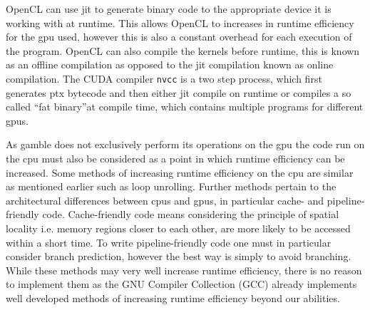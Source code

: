 OpenCL can use \acrshort{jit} to generate binary code to the appropriate device it is working with at runtime.
This allows OpenCL to increases in runtime efficiency for the \acrshort{gpu} used, however this is also a constant overhead for each execution of the program. 
OpenCL can also compile the kernels before runtime, this is known as an offline compilation as opposed to the \acrshort{jit} compilation known as online compilation. 
The CUDA compiler \texttt{nvcc} is a two step process, which first generates \acrshort{ptx} bytecode and then either \acrshort{jit} compile on runtime or compiles a so called ``fat binary''at compile time, which contains multiple programs for different \acrshort{gpu}s. \citep{nvidia_cude_fat_bin}

As \gls{gamble} does not exclusively perform its operations on the \acrshort{gpu} the code run on the \acrshort{cpu} must also be considered as a point in which runtime efficiency can be increased.
Some methods of increasing runtime efficiency on the \acrshort{cpu} are similar as mentioned earlier such as loop unrolling.
Further methods pertain to the architectural differences between \acrshort{cpu}s and \acrshort{gpu}s, in particular cache- and pipeline-friendly code.
Cache-friendly code means considering the principle of spatial locality i.e. memory regions closer to each other, are more likely to be accessed within a short time.
To write pipeline-friendly code one must in particular consider branch prediction, however the best way is simply to avoid branching. \citep{CCodeOpt}
While these methods may very well increase runtime efficiency, there is no reason to implement them as the GNU Compiler Collection (GCC) already implements well developed methods of increasing runtime efficiency beyond our abilities.